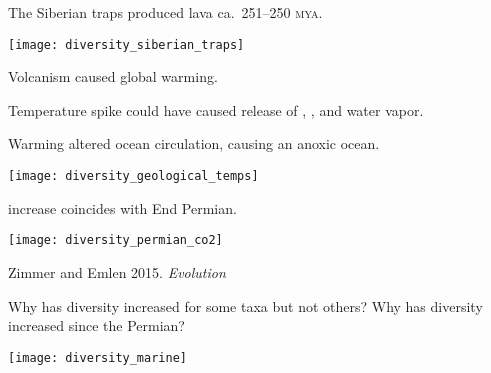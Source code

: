 \documentclass[t]{beamer}
\newcommand{\backskip}{\vspace{-0.5\baselineskip}}
\begin{document}

\begin{frame}{The Siberian traps produced lava ca.~251–250 \textsc{mya.}}

\backskip

\texttt{[image: diversity\_siberian\_traps]}

\end{frame}



\begin{frame}{Volcanism caused global warming.}

\backskip

\begin{multicols}{2}

\hangpara Temperature spike could have caused release of , , and water vapor.


\hangpara Warming altered ocean circulation, causing an anoxic ocean.


\columnbreak

\centering

\noindent\texttt{[image: diversity\_geological\_temps]}

\end{multicols}

\vfilll
	
\end{frame}



\begin{frame}{ increase coincides with End Permian.}

\backskip

\centering

\texttt{[image: diversity\_permian\_co2]}
	
\tinyfill \textcopyright Zimmer and Emlen 2015. \textit{Evolution}

\end{frame}




\begin{frame}{Why has diversity increased for some taxa but not others?  Why has diversity increased since the Permian?}

\backskip

\begin{multicols}{2}

\texttt{[image: diversity\_marine]}


\columnbreak



\hangpara {}

\hangpara {}

\hangpara {}


\end{multicols}

\end{frame}
\end{document}
